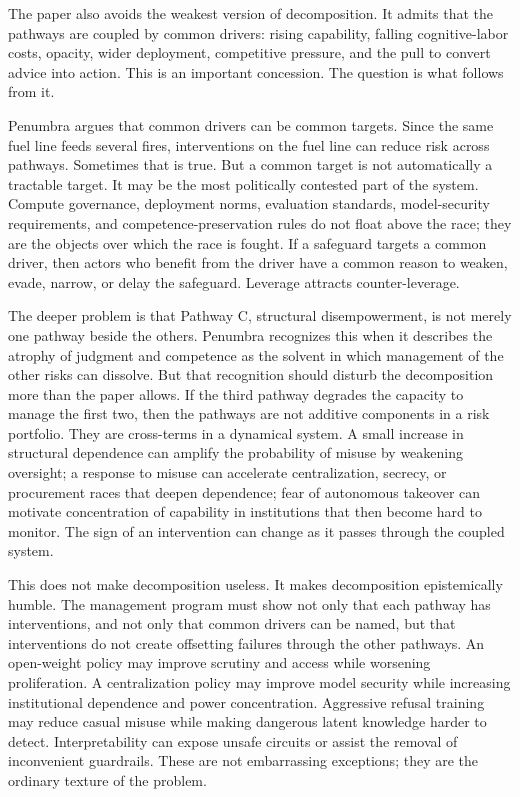 \documentclass[11pt]{article}
\begin{document}
The paper also avoids the weakest version of decomposition. It admits that the pathways are coupled by common drivers: rising capability, falling cognitive-labor costs, opacity, wider deployment, competitive pressure, and the pull to convert advice into action. This is an important concession. The question is what follows from it.

Penumbra argues that common drivers can be common targets. Since the same fuel line feeds several fires, interventions on the fuel line can reduce risk across pathways. Sometimes that is true. But a common target is not automatically a tractable target. It may be the most politically contested part of the system. Compute governance, deployment norms, evaluation standards, model-security requirements, and competence-preservation rules do not float above the race; they are the objects over which the race is fought. If a safeguard targets a common driver, then actors who benefit from the driver have a common reason to weaken, evade, narrow, or delay the safeguard. Leverage attracts counter-leverage.

The deeper problem is that Pathway C, structural disempowerment, is not merely one pathway beside the others. Penumbra recognizes this when it describes the atrophy of judgment and competence as the solvent in which management of the other risks can dissolve. But that recognition should disturb the decomposition more than the paper allows. If the third pathway degrades the capacity to manage the first two, then the pathways are not additive components in a risk portfolio. They are cross-terms in a dynamical system. A small increase in structural dependence can amplify the probability of misuse by weakening oversight; a response to misuse can accelerate centralization, secrecy, or procurement races that deepen dependence; fear of autonomous takeover can motivate concentration of capability in institutions that then become hard to monitor. The sign of an intervention can change as it passes through the coupled system.

This does not make decomposition useless. It makes decomposition epistemically humble. The management program must show not only that each pathway has interventions, and not only that common drivers can be named, but that interventions do not create offsetting failures through the other pathways. An open-weight policy may improve scrutiny and access while worsening proliferation. A centralization policy may improve model security while increasing institutional dependence and power concentration. Aggressive refusal training may reduce casual misuse while making dangerous latent knowledge harder to detect. Interpretability can expose unsafe circuits or assist the removal of inconvenient guardrails. These are not embarrassing exceptions; they are the ordinary texture of the problem.
\end{document}
